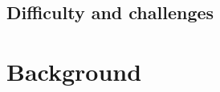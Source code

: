 \documentclass{article}
\begin{document}




\subsection{Difficulty and challenges}


\section{Background}
\end{document}
